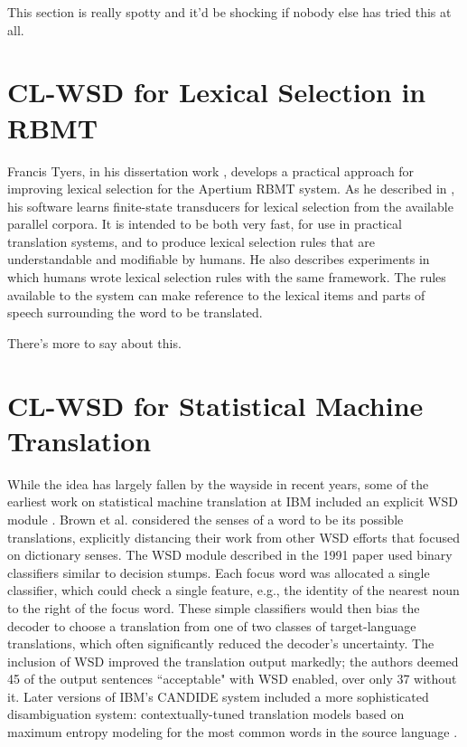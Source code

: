 This section is really spotty and it'd be shocking if nobody else has tried
this at all.

\section{CL-WSD for Lexical Selection in RBMT}
Francis Tyers, in his dissertation work \cite{tyers-dissertation}, develops a
practical approach for improving lexical selection for the Apertium RBMT
system. As he described in \cite{tyers-fst}, his software learns finite-state
transducers for lexical selection from the available parallel corpora.
It is intended to be both very fast, for use in practical translation systems,
and to produce lexical selection rules that are understandable and modifiable
by humans. He also describes experiments in which humans wrote lexical
selection rules with the same framework.
The rules available to the system can make reference to the lexical items and
parts of speech surrounding the word to be translated.

There's more to say about this.



\section{CL-WSD for Statistical Machine Translation}
While the idea has largely fallen by the wayside in recent years,
some of the earliest work on statistical machine translation at IBM included
an explicit WSD module \cite{Brown91word-sensedisambiguation}.
Brown et al. considered the senses of a word to be its possible translations,
explicitly distancing their work from other WSD efforts that focused on
dictionary senses.
The WSD module described in the 1991 paper used binary classifiers similar to
decision stumps. Each focus word was allocated a single classifier, which could
check a single feature, e.g., the identity of the nearest noun to the right of
the focus word.
These simple classifiers would then bias the decoder to choose a
translation from one of two classes of target-language translations,
which often significantly reduced the decoder's uncertainty. The inclusion of
WSD improved the translation output markedly; the authors deemed 45 of the
output sentences ``acceptable" with WSD enabled, over only 37 without it.
Later versions of IBM's CANDIDE system included a more sophisticated
disambiguation system: contextually-tuned translation models based on
maximum entropy modeling for the most common words in the source language
\cite{Berger:1994:CSM:1075812.1075844}.

